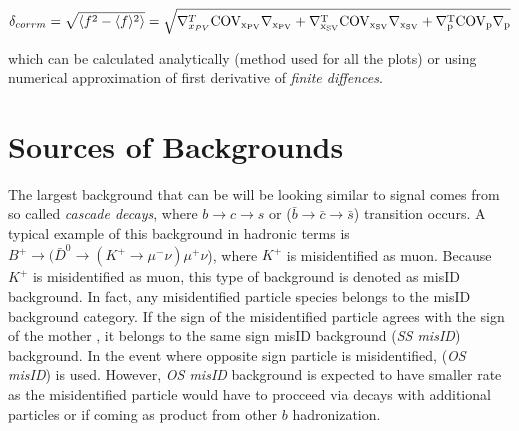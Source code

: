 \begin{equation}
\begin{aligned}
	\delta_{corrm} = \sqrt{ \langle f^{2}-\langle f \rangle^{2} \rangle} = \sqrt{\nabla^{T}_{x_{PV}} \rm{COV_{x_{PV}}} \nabla_{x_{PV}} + \nabla^{T}_{x_{SV}} \rm{COV_{x_{SV}}} \nabla_{x_{SV}} + \nabla^{T}_{p} \rm{COV_{p}} \nabla_{p}} 
\end{aligned}
\end{equation}

which can be calculated analytically (method used for all the plots) or using numerical approximation of first derivative of \textit{finite diffences}.

\section{Sources of Backgrounds}
The largest background that can be will be looking similar to signal comes from so called \textit{cascade decays}, where $b \rightarrow c \rightarrow s$ or ($\bar{b} \rightarrow \bar{c} \rightarrow \bar{s}$) transition occurs. A typical example of this background in hadronic terms is $B^{+} \rightarrow (\bar{D}^{0} \rightarrow (K^{+} \rightarrow \mu^{-} \nu) \mu^{+} \nu$), where $K^{+}$ is misidentified as muon. Because $K^{+}$ is misidentified as muon, this type of background is denoted as misID background. In fact, any misidentified particle species belongs to the misID background category. If the sign of the misidentified particle agrees with the sign of the mother \Bpm, it belongs to the same sign misID background (\textit{SS misID}) background. In the event where opposite sign particle is misidentified, (\textit{OS misID}) is used. However, \textit{OS misID} background is expected to have smaller rate as the misidentified particle would have to procceed via decays with additional particles or if coming as product from other $b$ hadronization.
